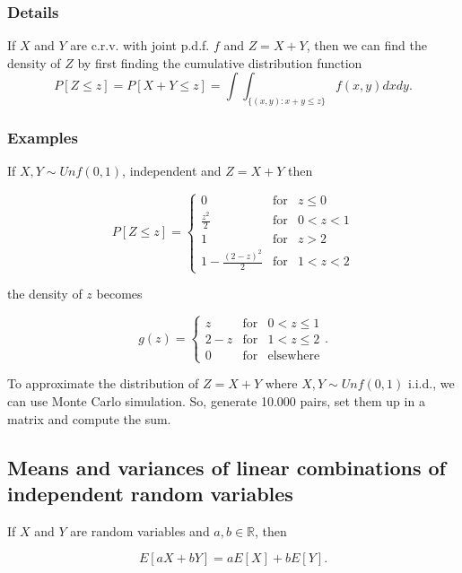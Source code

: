 \documentclass[12pt,a4paper]{article}
\theoremstyle{regla}
\theoremstyle{remark}
\theoremstyle{definition}
\theoremstyle{nonumberbreak}
\begin{document}
\subsubsection{Details}
If $X$ and $Y$ are c.r.v. with joint p.d.f. $f$ and $Z=X+Y$, then we can find the density of $Z$ by first finding the cumulative distribution function $$P[Z \leq z]=P[X+Y \leq z]=\int\int_{\{(x,y):x+y \leq z\}} f(x,y)dxdy.$$
\subsubsection{Examples}
\begin{xmpl}

If $X,Y \sim Unf(0,1)$, independent and $Z=X+Y$ then 
 
$$
P[Z \leq z]= 
\begin{cases}
  0 & \text{for} & z \leq 0\\
  \frac{z^2}{2} & \text{for} & 0< z <1\\
  1 & \text{for}& z>2\\
  1-\frac{(2-z)^2}{2} & \text{for} & 1< z <2
\end{cases}
$$

the density of $z$ becomes 

$$
g(z)= 
\begin{cases}
  z & \text{for} & 0 < z \leq 1\\
  2-z & \text{for} & 1 < z \leq 2\\
  0 & \text{for} & \text{elsewhere}
\end{cases}.
$$
\end{xmpl}

\begin{xmpl}

To approximate the distribution of $Z=X+Y$ where $X,Y \sim Unf(0,1)$ i.i.d., we can use Monte Carlo simulation. So, generate 10.000 pairs, set them up in a matrix and compute the sum. 
\end{xmpl}

\subsection{Means and variances of linear combinations of independent random variables}
\begin{fbox}
\begin{minipage}{0.97\textwidth}
If $X$ and $Y$ are random variables and $a,b\in\mathbb{R}$, then

$$
E[aX+bY] = aE[X]+bE[Y].
$$
\end{minipage}
\end{fbox}
\end{document}

